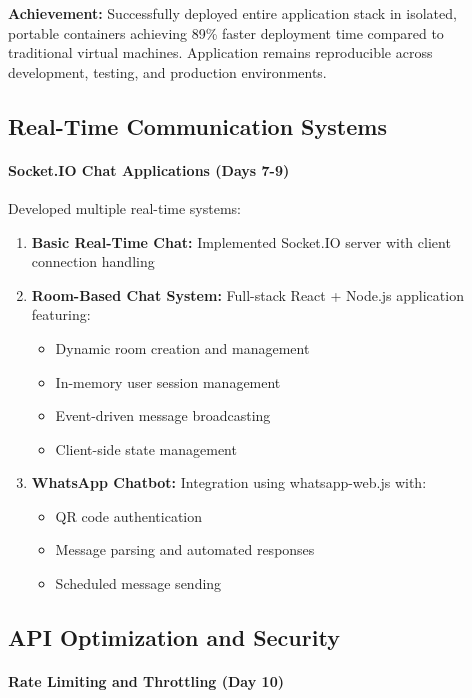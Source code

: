\textbf{Achievement:} Successfully deployed entire application stack in isolated, portable containers achieving 89\% faster deployment time compared to traditional virtual machines. Application remains reproducible across development, testing, and production environments.

\subsection{Real-Time Communication Systems}

\paragraph{Socket.IO Chat Applications (Days 7-9)}

Developed multiple real-time systems:

\begin{enumerate}
    \item \textbf{Basic Real-Time Chat:} Implemented Socket.IO server with client connection handling
    \item \textbf{Room-Based Chat System:} Full-stack React + Node.js application featuring:
    \begin{itemize}
        \item Dynamic room creation and management
        \item In-memory user session management
        \item Event-driven message broadcasting
        \item Client-side state management
    \end{itemize}
    \item \textbf{WhatsApp Chatbot:} Integration using whatsapp-web.js with:
    \begin{itemize}
        \item QR code authentication
        \item Message parsing and automated responses
        \item Scheduled message sending
    \end{itemize}
\end{enumerate}

\subsection{API Optimization and Security}

\paragraph{Rate Limiting and Throttling (Day 10)}

